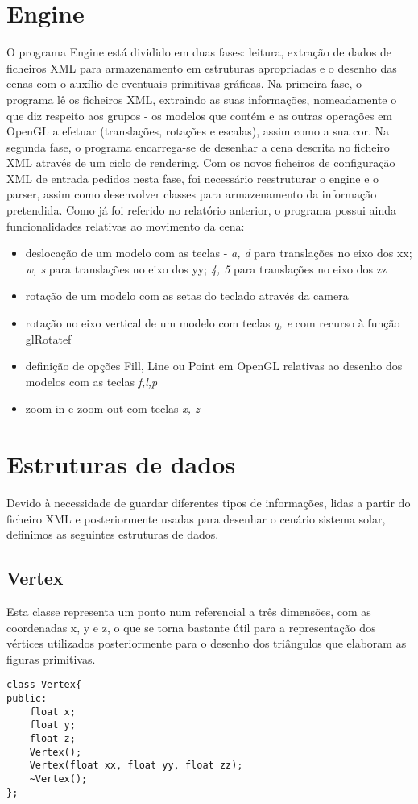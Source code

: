 \documentclass[12pt]{article}
\begin{document}
\section{Engine}
O programa Engine está dividido em duas fases: leitura, extração de dados de ficheiros
XML para armazenamento em estruturas apropriadas e o desenho das cenas com o auxílio de eventuais primitivas gráficas.
Na primeira fase, o programa lê os ficheiros XML, extraindo as suas informações,
nomeadamente o que diz respeito aos grupos - os modelos que contém e as outras operações em OpenGL a efetuar
(translações, rotações e escalas), assim como a sua cor.
Na segunda fase, o programa encarrega-se de desenhar a cena descrita no ficheiro XML
através de um ciclo de rendering.
Com os novos ficheiros de configuração XML de entrada pedidos nesta fase, foi necessário reestruturar o engine e o parser, assim 
como desenvolver classes para armazenamento da informação pretendida.
Como já foi referido no relatório anterior, o programa possui ainda funcionalidades relativas ao movimento da cena:
\begin{itemize}
\item deslocação de um modelo com as teclas - \textit{a, d} para translações no eixo dos xx; \textit{w, s} para translações no eixo dos yy; \textit{4, 5} para translações no eixo dos zz 
\item rotação de um modelo com as setas do teclado através da camera
\item rotação no eixo vertical de um modelo com teclas \textit{q, e} com recurso à função glRotatef
\item definição de opções Fill, Line ou Point em OpenGL relativas ao desenho dos modelos com as teclas \textit{f,l,p}
\item zoom in e zoom out com teclas \textit{x, z}
\end{itemize}
\newpage
\section{Estruturas de dados}
Devido à necessidade de guardar diferentes tipos de informações, lidas a partir
do ficheiro XML e posteriormente usadas para desenhar o cenário sistema
solar, definimos as seguintes estruturas de dados.
\subsection{Vertex}
Esta classe representa um ponto num referencial a três dimensões, com as
coordenadas x, y e z, o que se torna bastante útil para a representação dos
vértices utilizados posteriormente para o desenho dos triângulos que elaboram as figuras primitivas.
\begin{lstlisting}
class Vertex{
public:
	float x;
	float y;
	float z;
	Vertex();
	Vertex(float xx, float yy, float zz);
	~Vertex();
};
\end{lstlisting}
\end{document}
